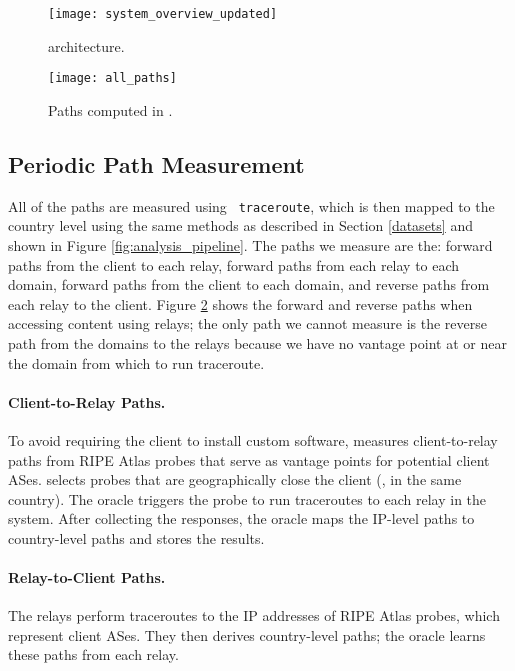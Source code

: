 \begin{figure*}[t!]
    \centering
    \begin{subfigure}[b]{0.45\textwidth}
        \texttt{[image: system\_overview\_updated]}
        \caption{\system{} architecture.}
        \label{fig:arch}
    \end{subfigure}
    \begin{subfigure}[b]{0.45\textwidth}
        \texttt{[image: all\_paths]}
        \caption{Paths computed in \system{}.}
        \label{fig:paths}
    \end{subfigure}
    \caption{\system{}'s architecture, and the path
      measurements that \system{} periodically computes.}
\end{figure*}

\subsection{Periodic Path Measurement}

All of the paths are measured using {\tt 
traceroute}, which is then mapped to the country level using the same methods as 
described in Section \ref{datasets} and shown in Figure 
\ref{fig:analysis_pipeline}.  The paths we measure are the: forward paths from 
the client to each relay, forward paths from each relay to each domain, forward 
paths from the client to each domain, and reverse paths from each relay to the 
client. Figure \ref{fig:paths} shows the forward and reverse paths when accessing 
content using relays; the only path we cannot measure is the reverse path from 
the domains to the relays because we have no 
vantage point at or near the domain from which to run traceroute.

\paragraph{Client-to-Relay Paths.} 
To avoid requiring the client to install custom software, \system{}
measures client-to-relay paths from RIPE Atlas probes that serve as 
vantage points for potential client ASes.  \system{} selects probes that
are geographically close the client (\eg, in the same 
country). The oracle triggers the probe to run traceroutes
to each relay in the system.  After collecting the responses, the oracle maps 
the IP-level paths to country-level paths and stores the results.

\paragraph{Relay-to-Client Paths.} The relays perform
traceroutes to the IP addresses of RIPE Atlas probes, which 
represent client ASes.  They then derives country-level paths; the
oracle learns these paths from each relay.  

